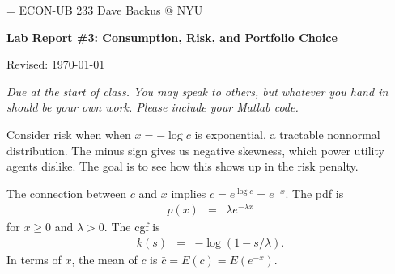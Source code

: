 \documentclass[11pt]{exam}
\begin{document}
\parskip=\bigskipamount
\parindent=0.0in
\thispagestyle{empty}
{\large ECON-UB 233 \hfill Dave Backus @ NYU}

\bigskip\bigskip
\centerline{\Large \bf Lab Report \#3: Consumption, Risk, and Portfolio Choice}
\centerline{Revised: \today}

\bigskip
{\it Due at the start of class.
You may speak to others, but whatever you hand in should be your own work.
Please include your Matlab code.}

\begin{questions}

Consider risk when when $x = - \log c $ is exponential,
a tractable nonnormal distribution.
The minus sign gives us negative skewness, which power utility agents
dislike.
The goal is to see how this shows up in the risk penalty.

The connection between $c$ and $x$ implies $c = e^{\log c} = e^{-x}$.
The pdf is
\begin{eqnarray*}
    p(x)  &=& \lambda e^{-\lambda x}
\end{eqnarray*}
for $x \geq 0$ and $\lambda > 0$.
The cgf is
\begin{eqnarray*}
    k(s)  &=& - \log \left( 1 - s/\lambda \right) .
\end{eqnarray*}
In terms of $x$, the mean of $c$ is $\bar{c} = E(c) = E (e^{-x})$.



\end{questions}
\end{document}
